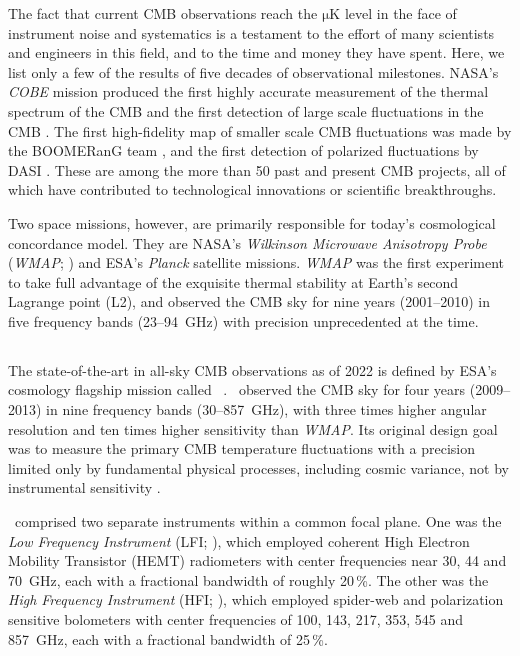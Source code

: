 \documentclass[onecolumn]{aa}
\def\WMAP{\emph{WMAP}}
\begin{document}
The fact that current CMB observations reach the $\mathrm{\mu K}$ level in the
face of instrument noise and systematics is a testament to the effort
of many scientists and engineers in this field, and to the time and
money they have spent.  Here, we list only a few of the results of
five decades of observational milestones.  NASA's \emph{COBE} mission
produced the first highly accurate measurement of the thermal spectrum
of the CMB \citep{mather:1994} and the first detection of large scale
fluctuations in the CMB \citep{smoot:1992}. The first high-fidelity
map of smaller scale CMB fluctuations was made by the BOOMERanG team
\citep{debernardis:2000}, and the first detection of polarized
fluctuations by DASI \citep{kovac:2002}.  These are among the more
than 50 past and present CMB projects, all of which have contributed to
technological innovations or scientific breakthroughs.

Two space missions, however, are primarily responsible for today's 
cosmological concordance model. They are NASA's \emph{Wilkinson Microwave
 Anisotropy Probe} (\WMAP; \citealp{bennett2012}) and ESA's
\emph{Planck} \citep{planck2016-l01} satellite missions. \emph{WMAP}
was the first experiment to take full advantage of the exquisite
thermal stability at Earth's second Lagrange point (L2), and observed
the CMB sky for nine years (2001--2010) in five frequency bands
(23--94~GHz) with precision unprecedented at the time. 

\subsection{\Planck}

The state-of-the-art in all-sky CMB observations as of 2022 is defined
by ESA's cosmology flagship mission called
\Planck\ \citep{planck2016-l01}. \Planck\ observed the CMB sky for
four years (2009--2013) in nine frequency bands (30--857~GHz), with
three times higher angular resolution and ten times higher sensitivity
than \WMAP. Its original design goal was to measure the primary CMB
temperature fluctuations with a precision limited only by fundamental
physical processes, including cosmic variance, not by instrumental
sensitivity \citep{planck2005-bluebook}.

\Planck\ comprised two separate instruments within a common focal plane. One was 
the \emph{Low Frequency Instrument} (LFI; \citealp{planck2016-l02}),
which employed coherent High Electron Mobility Transistor (HEMT)
radiometers with center frequencies near 30, 44 and 70~GHz,
 each with a fractional bandwidth of roughly 20\,\%. The other
was the \emph{High Frequency Instrument} (HFI;
\citealp{planck2016-l03}), which employed spider-web and polarization
sensitive bolometers with center frequencies of 100, 143, 217, 353,
545 and 857~GHz, each with a fractional bandwidth of 25\,\%.
\end{document}
